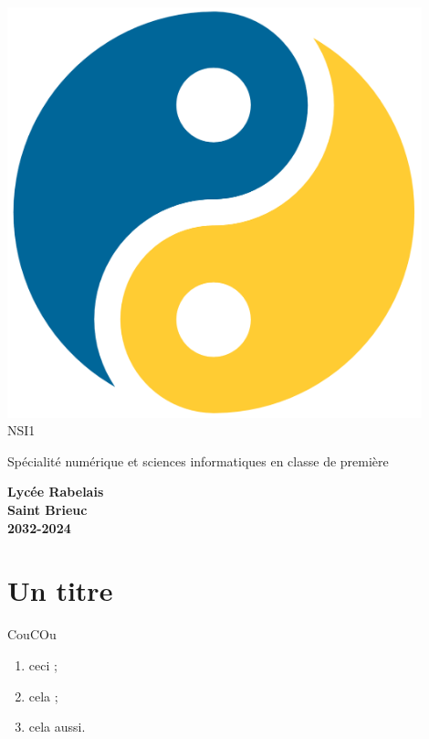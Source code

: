 \documentclass{nsibook}
\begin{document}
\begin{titlepage}
    \begin{center}
        \includegraphics[width=12cm]{yin_yang_python.png}\\[2em]

        {\bigtitlefont \LARGE\color{gray} NSI1}

        {\titlefont\Large\color{gray} Spécialité numérique et sciences informatiques en classe de première\\[2em]}

        {\color{gray}\textbf{Lycée Rabelais\\ Saint Brieuc\\ 2032-2024}}
    \end{center}
\end{titlepage}

\chapter{Un titre}

{\begin{flushright}
    CouCOu
\end{flushright}}
\begin{aretenir}
    \begin{enumerate}[--]
        \item ceci ;
        \item cela ;
        \item cela aussi.
    \end{enumerate}
\end{aretenir}
\end{document}
